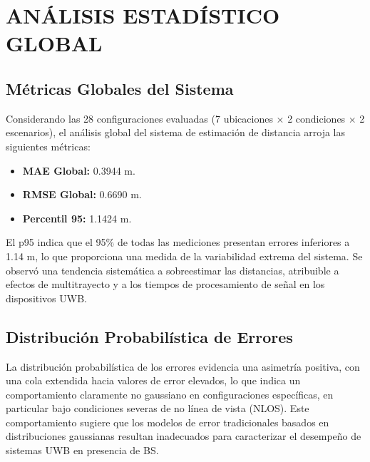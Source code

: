 \section{ANÁLISIS ESTADÍSTICO GLOBAL}
\label{sec:distribuciones_error}

\subsection{Métricas Globales del Sistema}

Considerando las 28 configuraciones evaluadas (7 ubicaciones × 2 condiciones × 2 escenarios), el análisis global del sistema de estimación de distancia arroja las siguientes métricas:
%
\begin{itemize}
\item \textbf{MAE Global:} 0.3944 m.
\item \textbf{RMSE Global:} 0.6690 m.  
\item \textbf{Percentil 95:} 1.1424 m.
\end{itemize}

El p95 indica que el 95\% de todas las mediciones presentan errores inferiores a 1.14 m, lo que proporciona una medida de la variabilidad extrema del sistema. Se observó una tendencia sistemática a sobreestimar las distancias, atribuible a efectos de multitrayecto y a los tiempos de procesamiento de señal en los dispositivos UWB.

\subsection{Distribución Probabilística de Errores}

La distribución probabilística de los errores evidencia una asimetría positiva, con una cola extendida hacia valores de error elevados, lo que indica un comportamiento claramente no gaussiano en configuraciones específicas, en particular bajo condiciones severas de no línea de vista (NLOS). Este comportamiento sugiere que los modelos de error tradicionales basados en distribuciones gaussianas resultan inadecuados para caracterizar el desempeño de sistemas UWB en presencia de BS.


